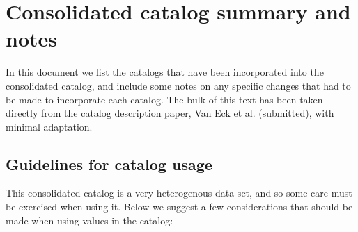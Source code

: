 \documentclass[10pt,modern]{aastex63}
\begin{document}
 
 
 
 \section{Consolidated catalog summary and notes}

In this document we list the catalogs that have been incorporated into the consolidated catalog, and include some notes on any specific changes that had to be made to incorporate each catalog. The bulk of this text has been taken directly from the catalog description paper, Van Eck et al. (submitted), with minimal adaptation.


\subsection{Guidelines for catalog usage}
This consolidated catalog is a very heterogenous data set, and so some care must be exercised when using it. Below we suggest a few considerations that should be made when using values in the catalog:
\end{document}
